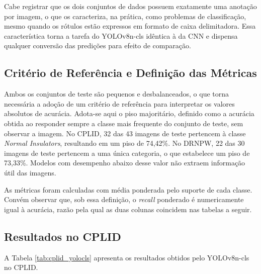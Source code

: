 Cabe registrar que os dois conjuntos de dados possuem exatamente uma anotação por imagem, o que os caracteriza, na prática, como problemas de classificação, mesmo quando os rótulos estão expressos em formato de caixa delimitadora. Essa característica torna a tarefa do YOLOv8n-cls idêntica à da CNN e dispensa qualquer conversão das predições para efeito de comparação.

\subsection{Critério de Referência e Definição das Métricas}

Ambos os conjuntos de teste são pequenos e desbalanceados, o que torna necessária a adoção de um critério de referência para interpretar os valores absolutos de acurácia. Adota-se aqui o piso majoritário, definido como a acurácia obtida ao responder sempre a classe mais frequente do conjunto de teste, sem observar a imagem. No CPLID, 32 das 43 imagens de teste pertencem à classe \textit{Normal Insulators}, resultando em um piso de 74,42\%. No DRNPW, 22 das 30 imagens de teste pertencem a uma única categoria, o que estabelece um piso de 73,33\%. Modelos com desempenho abaixo desse valor não extraem informação útil das imagens.

As métricas foram calculadas com média ponderada pelo suporte de cada classe. Convém observar que, sob essa definição, o \textit{recall} ponderado é numericamente igual à acurácia, razão pela qual as duas colunas coincidem nas tabelas a seguir.

\subsection{Resultados no CPLID}

A Tabela \ref{tab:cplid_yolocls} apresenta os resultados obtidos pelo YOLOv8n-cls no CPLID.


